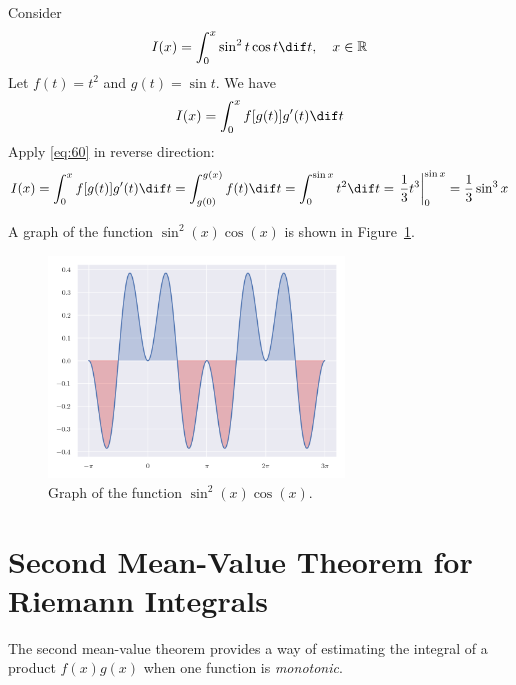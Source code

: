 \documentclass[thmcnt=section, color=blue, 12pt]{my-elegantbook}
\begin{document}
\begin{example}
	Consider
	\begin{align*}
		I(x) = \int_0^x \sin^2 t \cos t \dif t, \quad x \in \R
	\end{align*}
	Let $f(t) = t^2$ and $g(t) = \sin t$.
	We have
	\begin{align*}
		I(x) = \int_0^x f[g(t)] g^\prime(t) \dif t
	\end{align*}
	Apply \eqref{eq:60} in reverse direction:
	\begin{align*}
		I(x) = \int_0^x f[g(t)] g^\prime(t) \dif t
		= \int_{g(0)}^{g(x)} f(t) \dif t
		= \int_0^{\sin x} t^2 \dif t
		= \left . \frac{1}{3} t^3 \right\rvert_{0}^{\sin x}
		= \frac{1}{3} \sin^3 x
	\end{align*}

	A graph of the function $\sin^2(x) \cos(x)$ is shown in Figure~\ref{fig:11}.
	\begin{figure}[H]
		\centering
		\includegraphics[width=0.7\textwidth]{figures/change-of-variables-in-a-riemann-integral-example-1.png}
		\caption{Graph of the function $\sin^2(x) \cos(x)$.}
		\label{fig:11}
	\end{figure}
\end{example}



\section{Second Mean-Value Theorem for Riemann Integrals}

The second mean-value theorem provides a way of estimating the
integral of a product $f(x) g(x)$ when one function is \textit{monotonic}.
\end{document}
